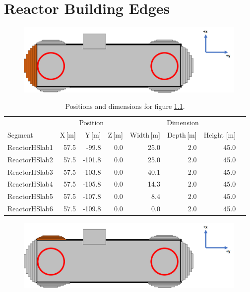 
\chapter{Reactor Building Edges} \label{appenC:ReactorBuildingEdges}

\begin{figure}[!h]
 \centering
 \includegraphics[width=\linewidth]{Chapter5/Figs/wylfaRasterNew/Slabs1.png}
 \label{fig:slabs1}
\end{figure}

\begin{table}[!h]
\centering
\begin{tabular}{lrrrrrrr}  
\toprule
\multicolumn{1}{c}{} & \multicolumn{3}{c}{Position} & \multicolumn{3}{c}{Dimension} \\
\cmidrule(r){2-4}
\cmidrule(r){5-7}
Segment       & X\,[m] & Y\,[m] & Z\,[m] & Width\,[m] & Depth\,[m] & Height [m]\\
\midrule
ReactorHSlab1 & 57.5   & -99.8  & 0.0    & 25.0       & 2.0        & 45.0\\
ReactorHSlab2 & 57.5   & -101.8 & 0.0    & 25.0       & 2.0        & 45.0\\
ReactorHSlab3 & 57.5   & -103.8 & 0.0    & 40.1       & 2.0        & 45.0\\
ReactorHSlab4 & 57.5   & -105.8 & 0.0    & 14.3       & 2.0        & 45.0\\
ReactorHSlab5 & 57.5   & -107.8 & 0.0    & 8.4        & 2.0        & 45.0\\
ReactorHSlab6 & 57.5   & -109.8 & 0.0    & 0.0        & 2.0        & 45.0\\
\bottomrule  
\end{tabular}
\caption{Positions and dimensions for figure \ref{fig:slabs1}.}
\label{tab:slabs1}
\end{table}

\begin{figure}[!h]
 \centering
 \includegraphics[width=\linewidth]{Chapter5/Figs/wylfaRasterNew/Slabs3.png}
 \label{fig:slabs3}
\end{figure}

